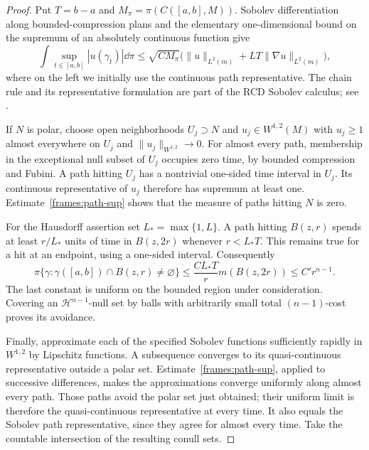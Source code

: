 \begin{proof}
 Put $T=b-a$ and $M_\pi=\pi(C([a,b],M))$.  Sobolev differentiation
 along bounded-compression plans and the elementary one-dimensional
 bound on the supremum of an absolutely continuous function give
 \begin{equation}\label{frames:path-sup}
  \int\sup_{t\in[a,b]}|u(\gamma_t)|\dd\pi
   \leq\sqrt{CM_\pi}
            \bigl(\|u\|_{L^2(m)}+LT\|\nabla u\|_{L^2(m)}\bigr),
 \end{equation}
 where on the left we initially use the continuous path representative.
 The chain rule and its representative formulation are part of the
 RCD Sobolev calculus; see \cite{Gigli2018,Savare2014}.

 If $N$ is polar, choose open neighborhoods $U_j\supset N$ and
 $u_j\in W^{1,2}(M)$ with $u_j\geq1$ almost everywhere on $U_j$
 and $\|u_j\|_{W^{1,2}}\to0$.
 For almost every path, membership in the exceptional null subset
 of $U_j$ occupies zero time, by bounded compression and Fubini.
 A path hitting $U_j$ has a nontrivial one-sided time interval in
 $U_j$.  Its continuous representative of $u_j$ therefore has
 supremum at least one.  Estimate~\eqref{frames:path-sup} shows that
 the measure of paths hitting $N$ is zero.

 For the Hausdorff assertion set $L_*=\max\{1,L\}$.
 A path hitting $B(z,r)$ spends at least $r/L_*$ units of time in
 $B(z,2r)$ whenever $r<L_*T$.  This remains true for a hit at an
 endpoint, using a one-sided interval.  Consequently
 \[
  \pi\{\gamma:\gamma([a,b])\cap B(z,r)\ne\varnothing\}
       \leq\frac{CL_*T}{r}m(B(z,2r))\leq C' r^{n-1}.
 \]
 The last constant is uniform on the bounded region under
 consideration.  Covering an $\mathcal H^{n-1}$-null set by balls
 with arbitrarily small total $(n-1)$-cost proves its avoidance.

 Finally, approximate each of the specified Sobolev functions
 sufficiently rapidly in $W^{1,2}$ by Lipschitz functions.
 A subsequence converges to its quasi-continuous representative
 outside a polar set.  Estimate~\eqref{frames:path-sup}, applied
 to successive differences, makes the approximations converge
 uniformly along almost every path.  Those paths avoid the polar
 set just obtained; their uniform limit is therefore the
 quasi-continuous representative at every time.  It also equals
 the Sobolev path representative, since they agree for almost
 every time.  Take the countable intersection of the resulting
 conull sets.
\end{proof}

